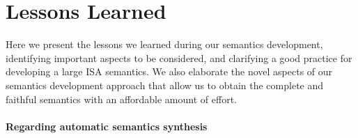 \section{Lessons Learned}
\label{sec:lesson-learned}
Here we present the lessons we learned during our semantics development,
     identifying important aspects to be considered, and clarifying a good
     practice for developing a large ISA semantics.  We also elaborate the
     novel aspects of our semantics development approach that allow us to
     obtain the complete and faithful semantics with an affordable amount of
     effort.

\paragraph{Regarding automatic semantics synthesis}

